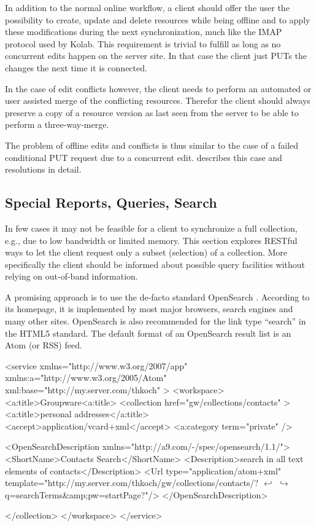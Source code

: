 \documentclass[11pt,a4paper,headsepline,twoside]{scrartcl}		%
\begin{document}
In addition to the normal online workflow, a client should offer the user the
possibility to create, update and delete resources while being offline and to
apply these modifications during the next synchronization, much like the IMAP
protocol used by Kolab. This requirement is trivial to fulfill as long as no
concurrent edits happen on the server site. In that case the client just PUTs
the changes the next time it is connected.

In the case of edit conflicts however, the client needs to perform an automated
or user assisted merge of the conflicting resources. Therefor the client should
always preserve a copy of a resource version as last seen from the server to be
able to perform a three-way-merge.

The problem of offline edits and conflicts is thus similar to the case of a
failed conditional PUT request due to a concurrent edit. \cite{Nielsen1999}
describes this case and resolutions in detail.


\subsection{Special Reports, Queries, Search}
\label{sec:spec-reports-search}

In few cases it may not be feasible for a client to synchronize a full
collection, e.g., due to low bandwidth or limited memory. This section explores
RESTful ways to let the client request only a subset (selection) of a
collection. More specifically the client should be informed about possible query
facilities without relying on out-of-band information.

A promising approach is to use the de-facto standard
OpenSearch \cite{Clinton}. According to its homepage, it is implemented by most
major browsers, search engines and many other sites. OpenSearch is also
recommended for the link type ``search'' in the HTML5
standard\cite[sec. 4.12.4.12]{Hickson2011a}. The default format of an OpenSearch
result list is an Atom (or RSS) feed.

\begin{anylisting}[language=xml,
                   label=fig:opensearch,
                   mathescape=true,
                   caption={An opensearch description document embedded in an Atom service document}]
<service xmlns="http://www.w3.org/2007/app"
         xmlns:a="http://www.w3.org/2005/Atom"
         xml:base="http://my.server.com/thkoch" >
 <workspace>
  <a:title>Groupware<a:title>
   <collection href="gw/collections/contacts" >
    <a:title>personal addresses</a:title>
    <accept>application/vcard+xml</accept>
    <a:category term="private" />

    <OpenSearchDescription xmlns="http://a9.com/-/spec/opensearch/1.1/">
     <ShortName>Contacts Search</ShortName>
     <Description>search in all text elements of contacts</Description>
     <Url type="application/atom+xml" 
      template="http://my.server.com/thkoch/gw/collections/contacts/? $\hookleftarrow$
       $\hookrightarrow$ q={searchTerms}&amp;pw={startPage?}"/>
    </OpenSearchDescription>

  </collection>
 </workspace>
</service>
\end{anylisting}
\end{document}
